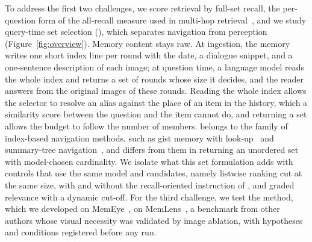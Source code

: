 To address the first two challenges, we score retrieval by full-set recall, the per-question form of the all-recall measure used in multi-hop retrieval~\citep{gutierrez2024hipporag}, and we study query-time set selection (\qss{}), which separates navigation from perception (Figure~\ref{fig:overview}). Memory content stays raw. At ingestion, the memory writes one short index line per round with the date, a dialogue snippet, and a one-sentence description of each image; at question time, a language model reads the whole index and returns a set of rounds whose size it decides, and the reader answers from the original images of these rounds. Reading the whole index allows the selector to resolve an alias against the place of an item in the history, which a similarity score between the question and the item cannot do, and returning a set allows the budget to follow the number of members. \qss{} belongs to the family of index-based navigation methods, such as gist memory with look-up~\citep{lee2024readagent} and summary-tree navigation~\citep{chen2023memwalker}, and differs from them in returning an unordered set with model-chosen cardinality. We isolate what this set formulation adds with controls that use the same model and candidates, namely listwise ranking cut at the same size, with and without the recall-oriented instruction of \qss{}, and graded relevance with a dynamic cut-off. For the third challenge, we test the method, which we developed on MemEye~\citep{guo2026memeye}, on MemLens~\citep{ren2026memlens}, a benchmark from other authors whose visual necessity was validated by image ablation, with hypotheses and conditions registered before any run.

